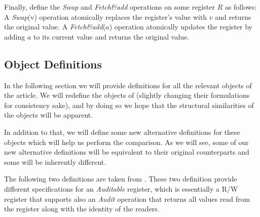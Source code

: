 \documentclass[11pt]{article}
\theoremstyle{definition}
\begin{document}
Finally, define the \textit{Swap} and \textit{Fetch\&add} operations on some register $R$ as follows: A \textit{Swap}(v) operation atomically replaces the register’s value with $v$ and returns the original value. A \textit{Fetch\&add}($a$) operation atomically updates the register by adding $a$ to its current value and returns the original value.

\subsection{Object Definitions}

In the following section we will provide definitions for all the relevant objects of the article. We will redefine the objects of \cite{AccessControl, AuditableRegs} (slightly changing their formulations for consistency sake), and by doing so we hope that the structural similarities of the objects will be apparent. 

In addition to that, we will define some new alternative definitions for these objects which will help us perform the comparison. As we will see, some of our new alternative definitions will be equivalent to their original counterparts and some will be inherently different.


The following two definitions are taken from \cite{AuditableRegs}. These two definition provide different specifications for an \textit{Auditable} register, which is essentially a R/W register that supports also an \textit{Audit} operation that returns all values read from the register along with the identity of the readers.
\end{document}
